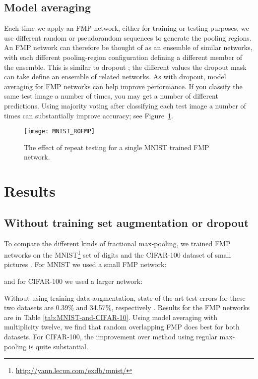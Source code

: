 \documentclass[english]{article}
\begin{document}
\subsection{Model averaging}

Each time we apply an FMP network, either for training or testing
purposes, we use different random or pseudorandom sequences to generate
the pooling regions. An FMP network can therefore be thought of as
an ensemble of similar networks, with each different pooling-region
configuration defining a different member of the ensemble. This is
similar to dropout \cite{dropout}; the different values the dropout
mask can take define an ensemble of related networks. As with dropout,
model averaging for FMP networks can help improve performance. If
you classify the same test image a number of times, you may get a
number of different predictions. Using majority voting after classifying
each test image a number of times can substantially improve accuracy;
see Figure~\ref{jury-size}.

\begin{figure}
\begin{centering}
\texttt{[image: MNIST\_ROFMP]}
\par\end{centering}

\caption{The effect of repeat testing for a single MNIST trained FMP network.
\label{jury-size}}
\end{figure}



\section{Results\label{sec:Results}}


\subsection{Without training set augmentation or dropout\label{sec:withoutDataAug}}

To compare the different kinds of fractional max-pooling, we trained
FMP networks on the MNIST\footnote{\url{http://yann.lecun.com/exdb/mnist/}} set of digits and the CIFAR-100 dataset of small pictures \cite{CIFAR10}.
For MNIST we used a small FMP network:

and for CIFAR-100 we used a larger network:

Without using training data augmentation, state-of-the-art test errors
for these two datasets are 0.39\% and 34.57\%, respectively \cite{DeeplySupervisedNets}.
Results for the FMP networks are in Table \ref{tab:MNIST-and-CIFAR-10}.
Using model averaging with multiplicity twelve, we find that random
overlapping FMP does best for both datasets. For CIFAR-100, the improvement
over method using regular max-pooling is quite substantial.
\end{document}
